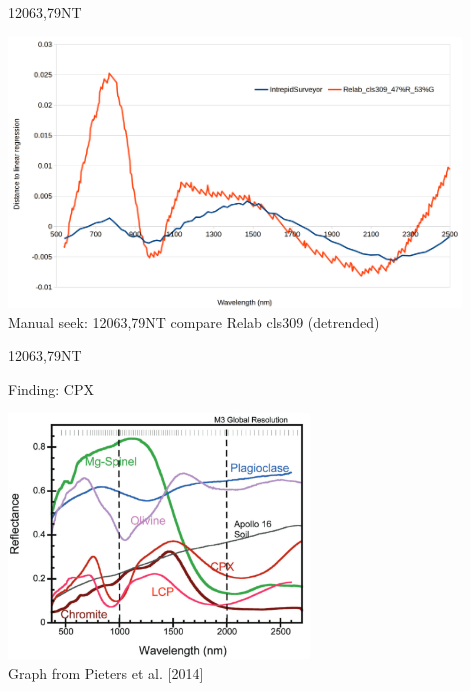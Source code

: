 \documentclass[unknownkeysallowed,xcolor=dvipsnames,beamer]{beamer} %
\begin{document}
\begin{frame}[fragile]{12063,79NT}
\begin{center}
  \includegraphics[width=12cm]{images/fig10}\\
  Manual seek: 12063,79NT compare Relab cls309 (detrended)
  \end{center}
\end{frame}

\begin{frame}[fragile]{12063,79NT}
\begin{block}{Finding: CPX}
\begin{center}
\includegraphics[width=8cm]{images/fig11}\\
Graph from Pieters et al. [2014]
\end{center}
\end{block}
\end{frame}
\end{document}
